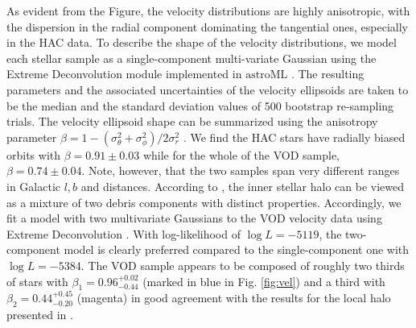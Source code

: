 \documentclass[fleqn,usenatbib]{mnras}
\begin{document}
As evident from the Figure, the velocity distributions are highly
anisotropic, with the dispersion in the radial component dominating
the tangential ones, especially in the HAC data. To describe the shape
of the velocity distributions, we model each stellar sample as a
single-component multi-variate Gaussian using the Extreme
Deconvolution module implemented in $\mathrm{astroML}$
\citep{astroML}. The resulting parameters and the associated
uncertainties of the velocity ellipsoids are taken to be the median
and the standard deviation values of 500 bootstrap re-sampling trials.
The velocity ellipsoid shape can be summarized using the anisotropy
parameter $\beta=1-(\sigma^2_{\theta}+\sigma^2_{\phi})/2\sigma^2_r$
\citep[see][]{Binney2008}. We find the HAC stars have radially biased
orbits with $\beta = 0.91 \pm 0.03$ while for the whole of the VOD
sample, $\beta = 0.74 \pm 0.04$. Note, however, that the two samples
span very different ranges in Galactic $l,b$ and distances. According
to \citet{Belokurov2018}, the inner stellar halo can be viewed as a
mixture of two debris components with distinct
properties. Accordingly, we fit a model with two multivariate
Gaussians to the VOD velocity data using Extreme Deconvolution
\citep[see][]{ED}. With log-likelihood of $\log L = -5119$, the
two-component model is clearly preferred compared to the
single-component one with $\log L = -5384$. The VOD sample appears to
be composed of roughly two thirds of stars with $\beta_{1}=
0.96^{+0.02}_{-0.44}$ (marked in blue in Fig. \ref{fig:vel}) and a
third with $\beta_{2}=0.44^{+0.45}_{-0.20}$ (magenta) in good
agreement with the results for the local halo presented in
\citet{Belokurov2018}.
%
\end{document}
